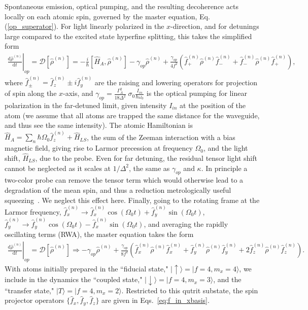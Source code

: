 \documentclass[preprint,aps,pra,onecolumn,superscriptaddress]{revtex4-1} %
\newcommand{\dt}[1]{\frac{{\mathrm d} {#1}}{{\mathrm d}t}}
\def\ket#1{\lvert{#1}\rangle}%
\begin{document}
\begin{appendix}
Spontaneous emission, optical pumping, and the resulting decoherence acts locally on each atomic spin, governed by the master equation, Eq. (\ref{op_superator}).  For light linearly polarized in the $x$-direction, and for detunings large compared to the excited state hyperfine splitting, this takes the simplified form~\cite{Deutsch2010a}
\begin{align}\label{eq:op_master}
\left.\dt{\hat{\rho}^{(n)}}\right|_{op} =\mathcal{D}[\hat{\rho}^{(n)}]=  -\frac{i}{\hbar}[ \hat{H}_A, \hat{\rho}^{(n)}] - {\gamma_{op}}\hat{\rho}^{(n)} +\frac{\gamma_{op}}{4 f^2} \left(\hat{f}^{(n)}_+  \hat{\rho}^{(n)}  \hat{f}^{(n)}_- + \hat{f}^{(n)}_- \hat{\rho}^{(n)}  \hat{f}^{(n)}_+\right),
\end{align}
where $\hat{f}^{(n)}_\pm = \hat{f}^{(n)}_z \pm i \hat{f}^{(n)}_y$ are the raising and lowering operators for projection of spin along the $x$-axis, and $\gamma_{op} = \frac{\Gamma_A^2}{18 \Delta^2}\;\sigma_0 \frac{I_{in}}{\hbar \omega_0}$ is the optical pumping for linear polarization in the far-detuned limit, given intensity $I_{in}$ at the position of the atom (we assume that all atoms are trapped the same distance for the waveguide, and thus see the same intensity). The atomic Hamiltonian is $\hat{H}_A = \sum_n \hbar \Omega_0 \hat{f}^{(n)}_z + \hat{H}_{LS}$, the sum of the Zeeman interaction with a bias magnetic field, giving rise to Larmor precession at frequency $\Omega_0$, and the light shift, $\hat{H}_{LS}$, due to the probe.  Even for far detuning, the residual tensor light shift cannot be neglected as it scales at $1/\Delta^2$, the same as $\gamma_{op}$ and $\kappa$.  In principle a two-color probe can remove the tensor term which would otherwise lead to a degradation of the mean spin, and thus a reduction metrologically useful squeezing~\cite{Saffman2009,Montano2015Quantum}.  We neglect this effect here.  Finally, going to the rotating frame at the Larmor frequency, $\hat{f}^{(n)}_x \rightarrow \hat{f}^{(n)}_x \cos(\Omega_0 t) + \hat{f}^{(n)}_y \sin(\Omega_0 t)$,  $\hat{f}^{(n)}_y \rightarrow \hat{f}^{(n)}_y \cos(\Omega_0 t) - \hat{f}^{(n)}_x \sin(\Omega_0 t)$, and averaging the rapidly oscillating terms (RWA), the master equation takes the form
\begin{align}\label{eq:op_master2}
\left.\dt{\hat{\rho}^{(n)}}\right|_{op}= \mathcal{D}[\hat{\rho}^{(n)}] \Rightarrow  -{\gamma_{op}} \hat{\rho}^{(n)} +\frac{\gamma_{op}}{8 f^2} \left(\hat{f}^{(n)}_x  \hat{\rho}^{(n)}  \hat{f}^{(n)}_x+\hat{f}^{(n)}_y  \hat{\rho}^{(n)}  \hat{f}^{(n)}_y +2 \hat{f}^{(n)}_z  \hat{\rho}^{(n)}  \hat{f}^{(n)}_z\right).
\end{align}
With  atoms initially prepared in the  ``fiducial state," $\ket{\uparrow} = \ket{f=4,m_x=4}$, we include  in the dynamics the ``coupled state,"  $\ket{\downarrow} = \ket{f=4,m_x=3}$, and the ``transfer state," $\ket{T} = \ket{f=4,m_x=2}$.  Restricted to this qutrit substate, the spin projector operators $\{ \hat{f}_x,  \hat{f}_y, \hat{f}_z \}$ are given in Eqs.~\eqref{eq:f_in_xbasis}.


\end{appendix}
\end{document}
